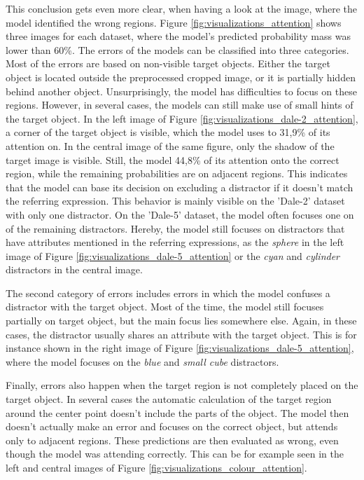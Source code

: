 This conclusion gets even more clear, when having a look at the image, where the model identified the wrong regions.
Figure \ref{fig:visualizations_attention} shows three images for each dataset, where the model's predicted probability mass was lower than 60\%.
The errors of the models can be classified into three categories.
Most of the errors are based on non-visible target objects.
Either the target object is located outside the preprocessed cropped image, or it is partially hidden behind another object.
Unsurprisingly, the model has difficulties to focus on these regions.
However, in several cases, the models can still make use of small hints of the target object.
In the left image of Figure \ref{fig:visualizations_dale-2_attention}, a corner of the target object is visible, which the model uses to 31,9\% of its attention on.
In the central image of the same figure, only the shadow of the target image is visible.
Still, the model 44,8\% of its attention onto the correct region, while the remaining probabilities are on adjacent regions.
This indicates that the model can base its decision on excluding a distractor if it doesn't match the referring expression.
This behavior is mainly visible on the 'Dale-2' dataset with only one distractor.
On the 'Dale-5' dataset, the model often focuses one on of the remaining distractors.
Hereby, the model still focuses on distractors that have attributes mentioned in the referring expressions, as the \emph{sphere} in the left image of Figure \ref{fig:visualizations_dale-5_attention} or the \emph{cyan} and \emph{cylinder} distractors in the central image.

The second category of errors includes errors in which the model confuses a distractor with the target object.
Most of the time, the model still focuses partially on target object, but the main focus lies somewhere else.
Again, in these cases, the distractor usually shares an attribute with the target object.
This is for instance shown in the right image of Figure \ref{fig:visualizations_dale-5_attention}, where the model focuses on the \emph{blue} and \emph{small cube} distractors.

Finally, errors also happen when the target region is not completely placed on the target object.
In several cases the automatic calculation of the target region around the center point doesn't include the parts of the object.
The model then doesn't actually make an error and focuses on the correct object, but attends only to adjacent regions.
These predictions are then evaluated as wrong, even though the model was attending correctly.
This can be for example seen in the left and central images of Figure \ref{fig:visualizations_colour_attention}.

